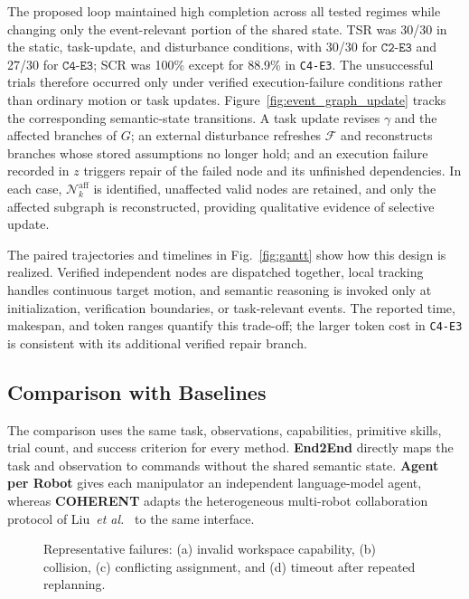 



The proposed loop maintained high completion across all tested regimes while
changing only the event-relevant portion of the shared state. TSR was 30/30 in
the static, task-update, and disturbance conditions, with 30/30 for
$\texttt{C2-E3}$ and 27/30 for $\texttt{C4-E3}$; SCR was 100\% except for 88.9\% in
\texttt{C4-E3}. The unsuccessful trials therefore occurred only under verified
execution-failure conditions rather than ordinary motion or task updates.
Figure~\ref{fig:event_graph_update} tracks the corresponding semantic-state
transitions. A task update revises $\gamma$ and the affected branches of $G$;
an external disturbance refreshes $\mathcal{F}$ and reconstructs branches whose
stored assumptions no longer hold; and an execution failure recorded in $z$
triggers repair of the failed node and its unfinished dependencies. In each
case, $\mathcal{N}_k^{\mathrm{aff}}$ is identified, unaffected valid nodes are
retained, and only the affected subgraph is reconstructed, providing
qualitative evidence of selective update.

The paired trajectories and timelines in Fig.~\ref{fig:gantt} show how this
design is realized. Verified independent nodes are dispatched together, local
tracking handles continuous target motion, and semantic reasoning is invoked
only at initialization, verification boundaries, or task-relevant events. The
reported time, makespan, and token ranges quantify this trade-off; the larger
token cost in \texttt{C4-E3} is consistent with its additional verified repair
branch.

\subsection{Comparison with Baselines}
\label{sec:baseline_comparison}

The comparison uses the same task, observations, capabilities, primitive
skills, trial count, and success criterion for every method. \textbf{End2End} directly
maps the task and observation to commands without the shared semantic state.
\textbf{Agent per Robot} gives each manipulator an independent language-model agent,
whereas \textbf{COHERENT} adapts the heterogeneous multi-robot collaboration protocol
of Liu~\emph{et al.}~\cite{liu2025coherent} to the same interface.

\begin{figure}[!t]
  \centering
  
  \caption{Representative failures: (a) invalid workspace capability, (b)
  collision, (c) conflicting assignment, and (d) timeout after repeated
  replanning.}
  \label{fig:failure_analysis}
\end{figure}

